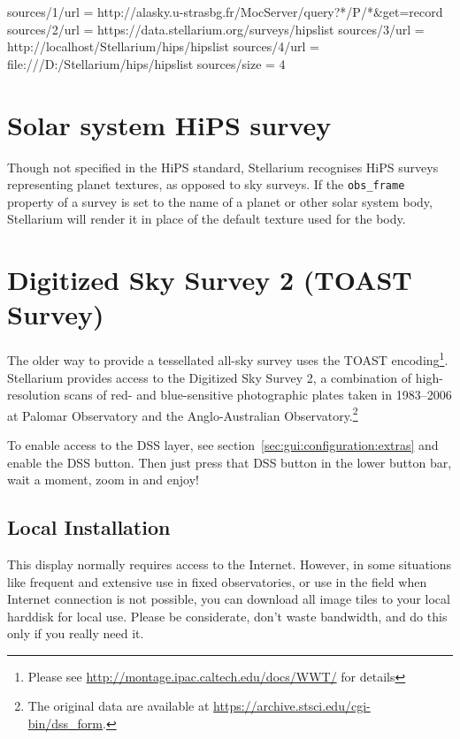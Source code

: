 \begin{configfile}[\scriptsize]
[hips]
sources/1/url = http://alasky.u-strasbg.fr/MocServer/query?*/P/*&get=record
sources/2/url = https://data.stellarium.org/surveys/hipslist
sources/3/url = http://localhost/Stellarium/hips/hipslist
sources/4/url = file:///D:/Stellarium/hips/hipslist
sources/size  = 4
\end{configfile}

\section{Solar system HiPS survey}

Though not specified in the HiPS standard, Stellarium recognises HiPS surveys
representing planet textures, as opposed to sky surveys.  If the
\texttt{obs\_frame} property of a survey is set to the name of a planet or
other solar system body, Stellarium will render it in place of the default
texture used for the body.


\section{Digitized Sky Survey 2 (TOAST Survey)}
\label{sec:TOAST}

The older way to provide a tessellated all-sky survey uses the TOAST
encoding\footnote{Please see
  \url{http://montage.ipac.caltech.edu/docs/WWT/} for details}.
Stellarium provides access to the Digitized Sky Survey 2, a
combination of high-resolution scans of red- and blue-sensitive
photographic plates taken in 1983--2006 at Palomar Observatory and the
Anglo-Australian Observatory.\footnote{The original data are available
  at \url{https://archive.stsci.edu/cgi-bin/dss_form}.}

To enable access to the DSS layer, see
section~\ref{sec:gui:configuration:extras} and enable the DSS
button. Then just press that DSS button in the lower button bar, wait
a moment, zoom in and enjoy!

\subsection{Local Installation}

This display normally requires access to the Internet. However, in
some situations like frequent and extensive use in fixed observatories,
or use in the field when Internet connection is not possible, you can
download all image tiles to your local harddisk for local use. Please be
considerate, don't waste bandwidth, and do this only if you really need it.

